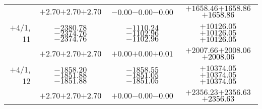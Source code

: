 \documentclass[compress]{beamer}
\begin{document}
\begin{frame}
{\begin{tabular}{r | c | c | c}
           & $+2.70$\hspace{0.1 cm}$+2.70$\hspace{0.1 cm}\textcolor{black}{$+2.70$} & $-0.00$\hspace{0.1 cm}$-0.00$\hspace{0.1 cm}\textcolor{black}{$-0.00$} & $+1658.46$\hspace{0.1 cm}$+1658.86$\hspace{0.1 cm}\textcolor{black}{$+1658.86$} \\
$+$4/1, 11 & $-2380.78$\hspace{0.1 cm}$-2374.76$\hspace{0.1 cm}\textcolor{black}{$-2374.76$} & $-1110.24$\hspace{0.1 cm}$-1102.96$\hspace{0.1 cm}\textcolor{black}{$-1102.96$} & $+10126.05$\hspace{0.1 cm}$+10126.05$\hspace{0.1 cm}\textcolor{black}{$+10126.05$} \\
           & $+2.70$\hspace{0.1 cm}$+2.70$\hspace{0.1 cm}\textcolor{black}{$+2.70$} & $+0.00$\hspace{0.1 cm}$+0.00$\hspace{0.1 cm}\textcolor{black}{$+0.01$} & $+2007.66$\hspace{0.1 cm}$+2008.06$\hspace{0.1 cm}\textcolor{black}{$+2008.06$} \\
$+$4/1, 12 & $-1858.20$\hspace{0.1 cm}$-1851.88$\hspace{0.1 cm}\textcolor{black}{$-1851.88$} & $-1858.55$\hspace{0.1 cm}$-1851.05$\hspace{0.1 cm}\textcolor{black}{$-1851.05$} & $+10374.05$\hspace{0.1 cm}$+10374.05$\hspace{0.1 cm}\textcolor{black}{$+10374.05$} \\
           & $+2.70$\hspace{0.1 cm}$+2.70$\hspace{0.1 cm}\textcolor{black}{$+2.70$} & $+0.00$\hspace{0.1 cm}$-0.00$\hspace{0.1 cm}\textcolor{black}{$-0.00$} & $+2356.23$\hspace{0.1 cm}$+2356.63$\hspace{0.1 cm}\textcolor{black}{$+2356.63$} \\
\end{tabular}}
\end{frame}
\end{document}
